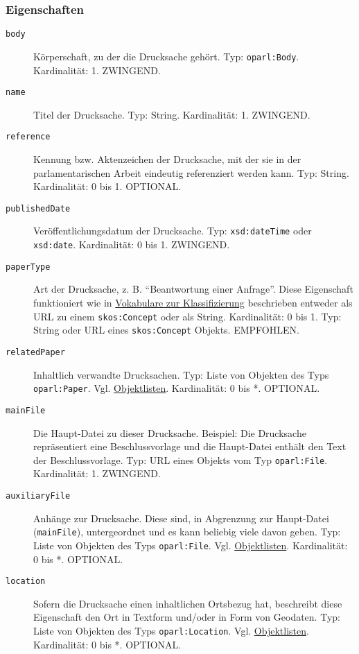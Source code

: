 \documentclass[,a4paper]{article}
\begin{document}
\subsubsection{Eigenschaften}\label{eigenschaften-6}

\begin{description}
\item[\texttt{body}]
Körperschaft, zu der die Drucksache gehört. Typ: \texttt{oparl:Body}.
Kardinalität: 1. ZWINGEND.
\item[\texttt{name}]
Titel der Drucksache. Typ: String. Kardinalität: 1. ZWINGEND.
\item[\texttt{reference}]
Kennung bzw. Aktenzeichen der Drucksache, mit der sie in der
parlamentarischen Arbeit eindeutig referenziert werden kann. Typ:
String. Kardinalität: 0 bis 1. OPTIONAL.
\item[\texttt{publishedDate}]
Veröffentlichungsdatum der Drucksache. Typ: \texttt{xsd:dateTime} oder
\texttt{xsd:date}. Kardinalität: 0 bis 1. ZWINGEND.
\item[\texttt{paperType}]
Art der Drucksache, z. B. ``Beantwortung einer Anfrage''. Diese
Eigenschaft funktioniert wie in
\hyperref[vokabulareux5fklassifizierung]{Vokabulare zur Klassifizierung}
beschrieben entweder als URL zu einem \texttt{skos:Concept} oder als
String. Kardinalität: 0 bis 1. Typ: String oder URL eines
\texttt{skos:Concept} Objekts. EMPFOHLEN.
\item[\texttt{relatedPaper}]
Inhaltlich verwandte Drucksachen. Typ: Liste von Objekten des Typs
\texttt{oparl:Paper}. Vgl. \hyperref[objektlisten]{Objektlisten}.
Kardinalität: 0 bis *. OPTIONAL.
\item[\texttt{mainFile}]
Die Haupt-Datei zu dieser Drucksache. Beispiel: Die Drucksache
repräsentiert eine Beschlussvorlage und die Haupt-Datei enthält den Text
der Beschlussvorlage. Typ: URL eines Objekts vom Typ
\texttt{oparl:File}. Kardinalität: 1. ZWINGEND.
\item[\texttt{auxiliaryFile}]
Anhänge zur Drucksache. Diese sind, in Abgrenzung zur Haupt-Datei
(\texttt{mainFile}), untergeordnet und es kann beliebig viele davon
geben. Typ: Liste von Objekten des Typs \texttt{oparl:File}. Vgl.
\hyperref[objektlisten]{Objektlisten}. Kardinalität: 0 bis *. OPTIONAL.
\item[\texttt{location}]
Sofern die Drucksache einen inhaltlichen Ortsbezug hat, beschreibt diese
Eigenschaft den Ort in Textform und/oder in Form von Geodaten. Typ:
Liste von Objekten des Typs \texttt{oparl:Location}. Vgl.
\hyperref[objektlisten]{Objektlisten}. Kardinalität: 0 bis *. OPTIONAL.

\end{description}
\end{document}

